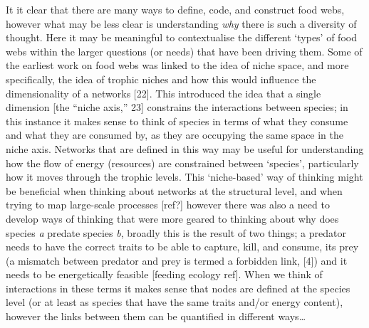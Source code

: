 \documentclass[
]{article}
\begin{document}
It it clear that there are many ways to define, code, and construct food
webs, however what may be less clear is understanding \emph{why} there
is such a diversity of thought. Here it may be meaningful to
contextualise the different `types' of food webs within the larger
questions (or needs) that have been driving them. Some of the earliest
work on food webs was linked to the idea of niche space, and more
specifically, the idea of trophic niches and how this would influence
the dimensionality of a networks {[}22{]}. This introduced the idea that
a single dimension {[}the ``niche axis,'' 23{]} constrains the
interactions between species; in this instance it makes sense to think
of species in terms of what they consume and what they are consumed by,
as they are occupying the same space in the niche axis. Networks that
are defined in this way may be useful for understanding how the flow of
energy (resources) are constrained between `species', particularly how
it moves through the trophic levels. This `niche-based' way of thinking
might be beneficial when thinking about networks at the structural
level, and when trying to map large-scale processes {[}ref?{]} however
there was also a need to develop ways of thinking that were more geared
to thinking about why does species \emph{a} predate species \emph{b},
broadly this is the result of two things; a predator needs to have the
correct traits to be able to capture, kill, and consume, its prey (a
mismatch between predator and prey is termed a forbidden link, {[}4{]})
and it needs to be energetically feasible {[}feeding ecology ref{]}.
When we think of interactions in these terms it makes sense that nodes
are defined at the species level (or at least as species that have the
same traits and/or energy content), however the links between them can
be quantified in different ways\ldots{}
\end{document}
